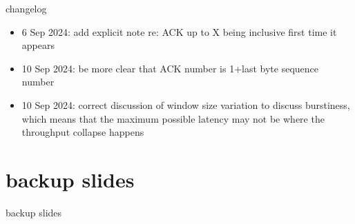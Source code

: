 \date{}
\title{}
\date{}
\usepackage{pgfplots}
\pgfplotsset{compat=1.16}

\begin{frame}
    \titlepage
\end{frame}

{\changelogmode
\begin{frame}{changelog}
    \begin{itemize}
    \item 6 Sep 2024: add explicit note re: ACK up to X being inclusive first time it appears
    \item 10 Sep 2024: be more clear that ACK number is 1+last byte sequence number
    \item 10 Sep 2024: correct discussion of window size variation to discuss burstiness, which means that the maximum possible latency may not be where the throughput collapse happens
    \end{itemize}
\end{frame}
}



\section{backup slides}
\begin{frame}{backup slides}
\end{frame}



